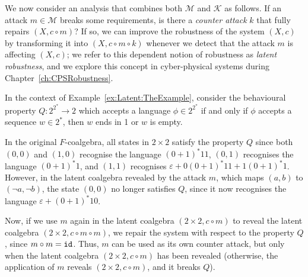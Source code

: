 We now consider an analysis that combines both $\mathcal{M}$ and $\mathcal{K}$ as follows. If an attack $m\in \mathcal{M}$ breaks some requirements, is there a \emph{counter attack} $k$ that fully repairs $(X,c\circ m)$? If so, we can improve the robustness of the system $(X,c)$ by transforming it into $(X,c\circ m \circ k)$ whenever we detect that the attack $m$ is affecting $(X,c)$; we refer to this dependent notion of robustness as \emph{latent robustness}, and we explore this concept in cyber-physical systems during Chapter~\ref{ch:CPSRobustness}.
\begin{example}
    In the context of Example~\ref{ex:Latent:TheExample}, consider the behavioural property $Q\colon 2^{2^*}\rightarrow 2$ which accepts a language $\phi \in 2^{2^*}$ if and only if $\phi$ accepts a sequence $w\in 2^*$, then $w$ ends in 1 or $w$ is empty.

    In the original $F$-coalgebra, all states in $2\times 2$ satisfy the property $Q$ since both $(0,0)$ and $(1,0)$ recognise the language $(0+1)^*11$, $(0,1)$ recognises the language $(0+1)^*1$, and $(1,1)$ recognises $\varepsilon + 0(0+1)^*11 + 1(0+1)^*1$. However, in the latent coalgebra revealed by the attack $m$, which maps $(a,b)$ to $(\lnot a, \lnot b)$, the state $(0,0)$ no longer satisfies $Q$, since it now recognises the language $\varepsilon+(0+1)^*10$. 

    Now, if we use $m$ again in the latent coalgebra $(2\times 2, c\circ m)$ to reveal the latent coalgebra $(2\times 2, c\circ m\circ m)$, we repair the system with respect to the property $Q$, since $m \circ m={\texttt{id}}$. Thus, $m$ can be used as its own counter attack, but only when the latent coalgebra $(2\times 2, c\circ m)$ has been revealed (otherwise, the application of $m$ reveals $(2\times 2, c\circ m)$, and it breaks $Q$).
\end{example}




